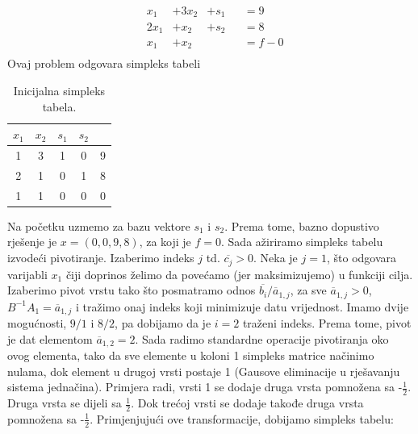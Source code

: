 \documentclass[a4paper, utf8, 11pt, colorlinks]{book}
\begin{document}
\begin{align*}
    & x_1    & + 3x_2  &+ s_1& &= 9 \\
    & 2 x_1 &   + x_2  & + s_2& &= 8 \\
    & x_1   &   + x_2  &\  & &= f - 0 \\
\end{align*}
 Ovaj problem odgovara simpleks tabeli \\
 \begin{table}[H]
     \centering
     \begin{tabular}{c c c c | c}
     	 $x_1$ & $x_2$ &  $s_1$ & $s_2$ & \\ \hline
         1 &  3  & 1 & 0 & 9 \\
         2 &  1  & 0 & 1 & 8 \\ \hline
         1 &  1  & 0  & 0 & 0 \\ \hline
     \end{tabular}
     \caption{Inicijalna simpleks tabela.}
     \label{tab:simpleks_tabela1}
 \end{table} 
 Na početku uzmemo za bazu vektore $s_1$ i $s_2$. Prema tome, bazno dopustivo rješenje je $x = (0, 0, 9, 8)$, za koji je $f =0$. Sada ažiriramo simpleks tabelu izvodeći pivotiranje. Izaberimo indeks $j$ td. $\overline{c_j}>0$. Neka je $j=1$, što odgovara varijabli $x_1$ čiji doprinos želimo da povećamo (jer maksimizujemo) u funkciji cilja. Izaberimo pivot vrstu tako što posmatramo odnos $\overline{b_i}/\overline{a}_{1,j}$, za sve $\overline{a}_{1,j} > 0$,  $B^{-1} A_1 = \overline{a}_{1,j}$
 i tražimo onaj indeks koji minimizuje datu vrijednost. Imamo dvije mogućnosti, $9/1$ i $8/2$, pa dobijamo da je $i = 2$ traženi indeks. Prema tome, pivot je dat elementom $\overline{a}_{1,2}=2$. Sada radimo standardne operacije pivotiranja oko ovog elementa,  tako da sve elemente u koloni 1 simpleks matrice načinimo nulama, dok element u drugoj vrsti postaje 1 (Gausove eliminacije u rješavanju sistema jednačina). Primjera radi, vrsti 1 se dodaje druga vrsta pomnožena sa -$\frac{1}{2}$. Druga vrsta se dijeli sa $\frac{1}{2}$. Dok trećoj vrsti se dodaje takođe druga vrsta pomnožena sa -$\frac{1}{2}$. 
 Primjenjujući ove transformacije, dobijamo simpleks tabelu:
 
\end{document}
